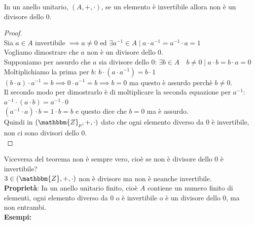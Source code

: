 \documentclass[12pt, letterpaper]{report}
\newcounter{theorem}
\begin{document}
 		 \begin{theorem}
 			In un anello unitario, $(A, +, \cdot)$, se un elemento è invertibile allora non è un divisore dello 0.
 			 \begin{proof} \quad \\
 				Sia $a \in A$ invertibile $\implies a \neq 0$ ed $\exists a^{-1} \in A \mid a \cdot a^{-1} = a^{-1} \cdot a = 1$ \\
 				Vogliamo dimostrare che $a$ non è un divisore dello 0. \\
 				Supponiamo per assurdo che $a$ sia divisore dello 0: $\exists b \in A \quad b \neq 0 \mid a \cdot b = b \cdot a = 0$ \\
 				Moltiplichiamo la prima per $b$: $b \cdot (a \cdot a^{-1}) = b \cdot 1$ \\
 				$(b \cdot a) \cdot a^{-1} = b \implies 0 \cdot a^{-1} = b \implies b = 0$ ma questo è assurdo perchè $b \neq 0$. \\
 				Il secondo modo per dimostrarlo è di moltiplicare la seconda equazione per $a^{-1}$: $a^{-1} \cdot (a \cdot b) = a^{-1} \cdot 0$ \\
 				$(a^{-1} \cdot a) \cdot b = 1 \cdot b = b$ e questo dice che $b = 0$ ma è assurdo. \\
 				Quindi in $(\mathbbm{Z}_p, +, \cdot)$ dato che ogni elemento diverso da 0 è invertibile, non ci sono divisori dello 0. \\

 			\end{proof}
 		\end{theorem}
 		Viceversa del teorema non è sempre vero, cioè se non è divisore dello 0 è invertibile? \\
 		$3 \in (\mathbbm{Z}, +, \cdot)$ non è divisore ma non è neanche invertibile. \\
 		\textbf{Proprietà}: In un anello unitario finito, cioè $A$ contiene un numero finito di elementi, ogni elemento diverso da 0 o è invertibile o è un divisore dello 0, ma non entrambi. \\
 		\textbf{Esempi:}
\end{document}

